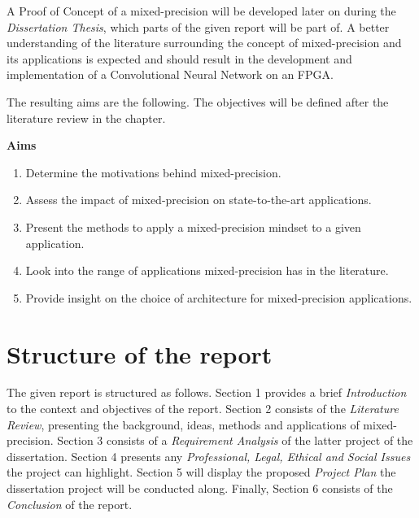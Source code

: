 A Proof of Concept of a mixed-precision will be developed later on during the \emph{Dissertation Thesis}, which parts of the given report will be part of. A better understanding of the literature surrounding the concept of mixed-precision and its applications is expected and should result in the development and implementation of a Convolutional Neural Network on an FPGA.

The resulting aims are the following. The objectives will be defined after the literature review in the  chapter.

\textbf{Aims}
\begin{enumerate}
  \item Determine the motivations behind mixed-precision.
  \item Assess the impact of mixed-precision on state-to-the-art applications.
  \item Present the methods to apply a mixed-precision mindset to a given application.
  \item Look into the range of applications mixed-precision has in the literature.
  \item Provide insight on the choice of architecture for mixed-precision applications.
\end{enumerate}


\section{Structure of the report}

The given report is structured as follows. Section 1 provides a brief \emph{Introduction} to the context and objectives of the report. Section 2 consists of the \emph{Literature Review}, presenting the background, ideas, methods and applications of mixed-precision. Section 3 consists of a \emph{Requirement Analysis} of the latter project of the dissertation. Section 4 presents any \emph{Professional, Legal, Ethical and Social Issues} the project can highlight. Section 5 will display the proposed \emph{Project Plan} the dissertation project will be conducted along. Finally, Section 6 consists of the \emph{Conclusion} of the report.
